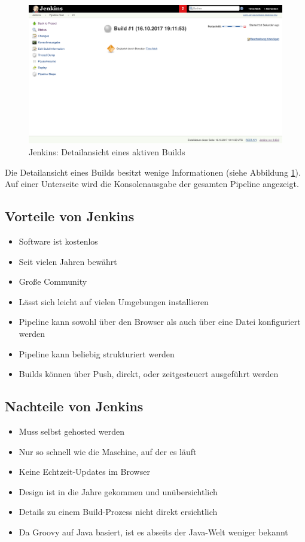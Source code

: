 \begin{figure}[h]
  \caption{Jenkins: Detailansicht eines aktiven Builds}
  \label{fig:jenkins-build-detail}
  \includegraphics[width=.8\textwidth]{assets/jenkins-build-detail}
\end{figure}

Die Detailansicht eines Builds besitzt wenige Informationen (siehe Abbildung \ref{fig:jenkins-build-detail}). Auf einer Unterseite wird die Konsolenausgabe der gesamten Pipeline angezeigt.

\subsection*{Vorteile von Jenkins}

\begin{itemize}
  \item Software ist kostenlos
  \item Seit vielen Jahren bewährt
  \item Große Community
  \item Lässt sich leicht auf vielen Umgebungen installieren
  \item Pipeline kann sowohl über den Browser als auch über eine Datei konfiguriert werden
  \item Pipeline kann beliebig strukturiert werden
  \item Builds können über Push, direkt, oder zeitgesteuert ausgeführt werden
\end{itemize}

\subsection*{Nachteile von Jenkins}

\begin{itemize}
  \item Muss selbst gehosted werden
  \item Nur so schnell wie die Maschine, auf der es läuft
  \item Keine Echtzeit-Updates im Browser
  \item Design ist in die Jahre gekommen und unübersichtlich
  \item Details zu einem Build-Prozess nicht direkt ersichtlich
  \item Da Groovy auf Java basiert, ist es abseits der Java-Welt weniger bekannt
\end{itemize}

